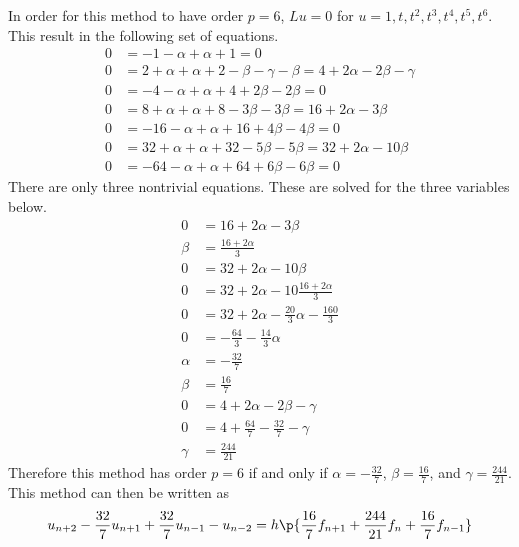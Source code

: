 \documentclass[11pt]{article}
\begin{document}
\begin{enumerate}
\begin{enumerate}
                In order for this method to have order $p = 6$, $Lu = 0$ for
                $u = 1, t, t^2, t^3, t^4, t^5, t^6$.
                This result in the following set of equations.
                \begin{align*}
                    0 &= -1 - \alpha + \alpha + 1 = 0 \\
                    0 &= 2 + \alpha + \alpha + 2 - \beta - \gamma - \beta = 4 + 2\alpha -2\beta - \gamma \\
                    0 &= -4 - \alpha + \alpha  + 4 + 2\beta  - 2\beta = 0 \\
                    0 &= 8 + \alpha + \alpha + 8 - 3\beta - 3\beta = 16 + 2\alpha - 3\beta \\
                    0 &= -16 - \alpha + \alpha + 16 + 4\beta - 4\beta = 0 \\
                    0 &= 32 + \alpha  + \alpha + 32 - 5\beta - 5\beta = 32 + 2\alpha - 10\beta \\
                    0 &= -64 - \alpha + \alpha + 64 + 6\beta - 6\beta = 0
                \end{align*}
                There are only three nontrivial equations.
                These are solved for the three variables below.
                \begin{align*}
                    0 &= 16 + 2\alpha - 3\beta \\
                    \beta &= \frac{16 + 2\alpha}{3} \\
                    0 &= 32 + 2\alpha - 10\beta \\
                    0 &= 32 + 2\alpha - 10\frac{16 + 2\alpha}{3}\\
                    0 &= 32 + 2\alpha - \frac{20}{3}\alpha - \frac{160}{3} \\
                    0 &= -\frac{64}{3} - \frac{14}{3}\alpha \\
                    \alpha &= -\frac{32}{7} \\
                    \beta &= \frac{16}{7} \\
                    0 &= 4 + 2\alpha -2\beta - \gamma \\
                    0 &= 4 + \frac{64}{7} - \frac{32}{7} - \gamma \\
                    \gamma &= \frac{244}{21}
                \end{align*}
                Therefore this method has order $p = 6$ if and only if $\alpha = -\frac{32}{7}$,
                $\beta = \frac{16}{7}$, and $\gamma = \frac{244}{21}$.
                This method can then be written as
                \[
                    u_{n+2} - \frac{32}{7} u_{n+1} + \frac{32}{7} u_{n-1} - u_{n-2} =
                    h\p{\frac{16}{7} f_{n+1} + \frac{244}{21}f_n + \frac{16}{7}f_{n-1}}
                \]


\end{enumerate}
\end{enumerate}
\end{document}
